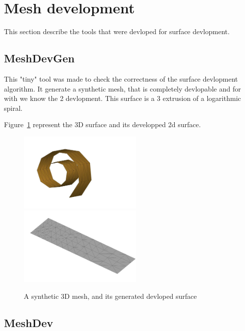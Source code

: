
\section{Mesh development}

This section describe the tools that were devloped for surface devlopment.

\subsection{MeshDevGen}
This "tiny" tool was made to check the correctness of the surface devlopment algorithm. 
It generate a synthetic mesh, that is completely devlopable and for with we
know the 2 devlopment. This surface is a $3$ extrusion of a logarithmic spiral.

Figure~\ref{fig:SpirAndDev} represent the 3D surface and its developped 2d surface.

\begin{figure}
\centering
\includegraphics[width=6cm]{CommandReferences/ImagesComRef/Cyl3D01.jpg}
\includegraphics[width=6cm]{CommandReferences/ImagesComRef/CylDev00.jpg}
\caption{A synthetic 3D mesh, and its generated devloped surface}
\label{fig:SpirAndDev}
\end{figure}

\subsection{MeshDev}


